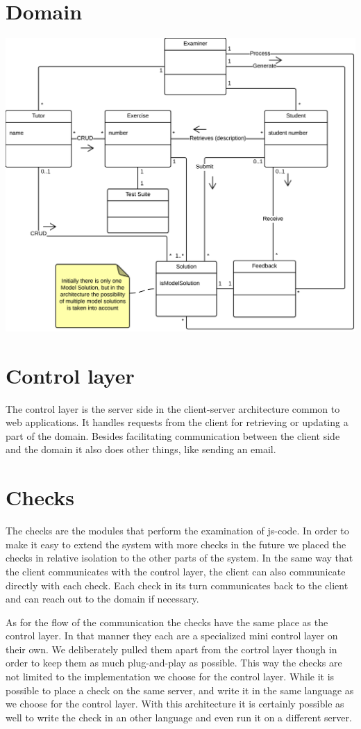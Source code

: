 \section{Domain}
\includegraphics[scale=0.8]{diagrams-images/domain-model}

\section{Control layer}
The control layer is the server side
in the client-server architecture common to web applications.
It handles requests from the client
for retrieving or updating a part of the domain.
Besides facilitating communication between the client side and the domain
it also does other things, like sending an email.

\section{Checks}
The checks are the modules that perform the examination of \gls{js-code}.
In order to make it easy to extend the system with more checks in the future
we placed the checks in relative isolation to the other parts of the system.
In the same way that the client communicates with the control layer,
the client can also communicate directly with each check.
Each check in its turn communicates back to the client
and can reach out to the domain if necessary.

As for the flow of the communication
the checks have the same place as the control layer.
In that manner they each are a specialized mini control layer on their own.
We deliberately pulled them apart from the cortrol layer though
in order to keep them as much plug-and-play as possible.
This way the checks are not limited
to the implementation we choose for the control layer.
While it is possible to place a check on the same server,
and write it in the same language as we choose for the control layer.
With this architecture it is certainly possible as well
to write the check in an other language
and even run it on a different server.

